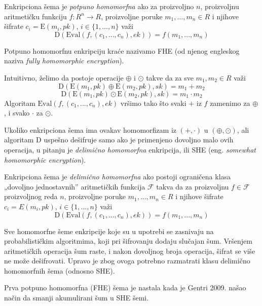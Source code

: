 \begin{definition}
    \label{dfn_fhe}
Enkripciona \v sema je \textit{potpuno homomorfna} ako za proizvoljno $n$, proizvoljnu aritmeti\v cku funkciju $f:R^n\rightarrow R$, proizvoljne poruke $m_1, ..., m_n\in R$ i njihove \v sifrate $c_i = \mathrm{E}(m_i, pk)$, $i\in \{1, ..., n\}$ va\v zi
$$\mathrm{D}(\mathrm{Eval}(f, (c_1, ..., c_n), ek)) = f(m_1, ..., m_n)$$
\end{definition}

Potpuno homomorfnu enkripciju kra\' ce nazivamo FHE (od njenog engleskog naziva \textit{fully homomorphic encryption}).

Intuitivno, \v zelimo da postoje operacije $\oplus$ i $\odot$ takve da za sve $m_1, m_2 \in R$ va\v zi
    $$\mathrm{D}(\mathrm{E}(m_1, pk) \oplus \mathrm{E}(m_2, pk), sk) = m_1 + m_2$$
    $$\mathrm{D}(\mathrm{E}(m_1, pk) \odot \mathrm{E}(m_2, pk), sk) = m_1 \cdot m_2$$
Algoritam $\mathrm{Eval}(f, (c_1, ..., c_n), ek)$ vr\v simo tako \v sto svaki $+$ iz $f$ zamenimo za $\oplus$, i svako $\cdot$ za $\odot$.

Ukoliko enkripciona \v sema ima ovakav homomorfizam iz $(+, \cdot)$ u $(\oplus, \odot)$, ali algoritam $\mathrm{D}$ uspe\v sno de\v sifruje samo ako je primenjeno dovoljno malo ovih operacija, u pitanju je \textit{delimi\v cno homomorfna} enkripcija, ili SHE (eng. \textit{somewhat homomorphic encryption}).

\begin{definition}
    Enkripciona \v sema je \textit{delimi\v cno homomorfna} ako postoji ograni\v cena klasa „dovoljno jednostavnih” aritmeti\v ckih funkcija $\mathcal{F}$ takva da za proizvoljnu $f\in \mathcal{F}$ proizvoljnog reda $n$, proizvoljne poruke $m_1, ..., m_n\in R$ i njihove \v sifrate $c_i = E(m_i, pk)$, $i\in \{1, ..., n\}$ va\v zi
$$\mathrm{D}(\mathrm{Eval}(f, (c_1, ..., c_n), ek)) = f(m_1, ..., m_n)$$
\end{definition}

Sve homomorfne \v seme enkripcije koje su u upotrebi se zasnivaju na probabilisti\v ckim algoritmima, koji pri \v sifrovanju dodaju slu\v cajan \v sum. Vr\v senjem aritmeti\v ckih operacija \v sum raste, i nakon dovoljnog broja operacija, \v sifrat se vi\v se ne mo\v ze de\v sifrovati. 
Upravo je zbog ovoga potrebno razmatrati klasu delimi\v cno homomorfnih \v sema (odnosno SHE).

Prva potpuno homomorfna (FHE) \v sema je nastala kada je Gentri 2009. na\v sao na\v cin da smanji akumulirani \v sum u SHE \v semi.

